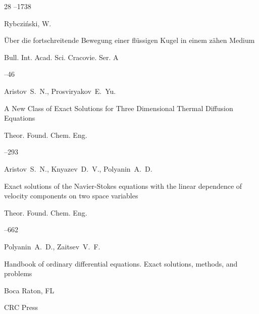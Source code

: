 \begin{thebibliography}{28}
--1738 







\by Rybczi\'nski, W.

\paper \"Uber die fortschreitende Bewegung einer fl\"ussigen Kugel in einem z\"ahen Medium


\jour Bull. Int. Acad. Sci. Cracovie. Ser. A


--46 





\by Aristov~S.~N., Prosviryakov~E.~Yu. 

\paper A New Class of Exact Solutions for Three Dimensional Thermal Diffusion Equations

\jour Theor. Found. Chem. Eng.




--293





\by Aristov~S.~N., Knyazev~D.~V., Polyanin~A.~D.

\paper Exact solutions of the Navier-Stokes equations with the linear dependence of velocity components on two space variables

\jour Theor. Found. Chem. Eng.





--662




\by Polyanin~A.~D., Zaitsev~V.~F.

\book Handbook of ordinary differential equations. Exact solutions, methods, and problems


\publaddr Boca Raton, FL

\publ CRC Press 


\end{thebibliography}
